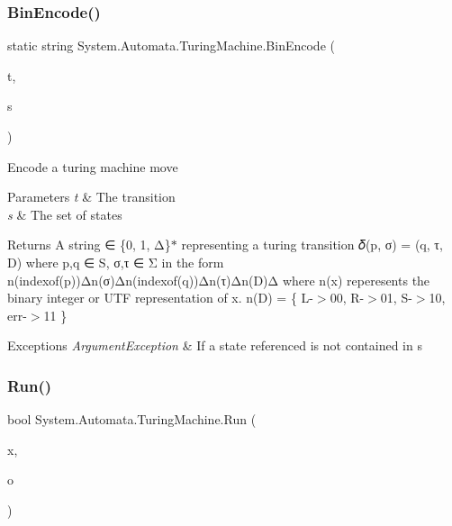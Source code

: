 \subsubsection{\texorpdfstring{Bin\+Encode()}{BinEncode()}\hspace{0.1cm}{\footnotesize\ttfamily [6/6]}}
{\footnotesize\ttfamily static string System.\+Automata.\+Turing\+Machine.\+Bin\+Encode (\begin{DoxyParamCaption}\item[{\mbox{\hyperlink{class_system_1_1_automata_1_1_turing_transition}{Turing\+Transition}}}]{t,  }\item[{\mbox{\hyperlink{class_system_1_1_automata_1_1_states}{States}}}]{s }\end{DoxyParamCaption})\hspace{0.3cm}{\ttfamily [static]}}



Encode a turing machine move 


\begin{DoxyParams}{Parameters}
{\em t} & The transition\\
\hline
{\em s} & The set of states\\
\hline
\end{DoxyParams}
\begin{DoxyReturn}{Returns}
A string ∈ \{0, 1, Δ\}$\ast$ representing a turing transition 𝛿(p, σ) = (q, τ, D) where p,q ∈ S, σ,τ ∈ Σ in the form n(indexof(p))Δn(σ)Δn(indexof(q))Δn(τ)Δn(\+D)Δ where n(x) reperesents the binary integer or U\+TF representation of x. n(\+D) = \{ L-\/$>$00, R-\/$>$01, S-\/$>$10, err-\/$>$11 \} 
\end{DoxyReturn}

\begin{DoxyExceptions}{Exceptions}
{\em Argument\+Exception} & If a state referenced is not contained in s\\
\hline
\end{DoxyExceptions}
\mbox{\label{class_system_1_1_automata_1_1_turing_machine_a49d164f2e9784ad4ac23410c702ad1b0}} 
\subsubsection{\texorpdfstring{Run()}{Run()}}
{\footnotesize\ttfamily bool System.\+Automata.\+Turing\+Machine.\+Run (\begin{DoxyParamCaption}\item[{I\+Enumerable$<$ char $>$}]{x,  }\item[{out char \mbox{[}$\,$\mbox{]}}]{o }\end{DoxyParamCaption})}



